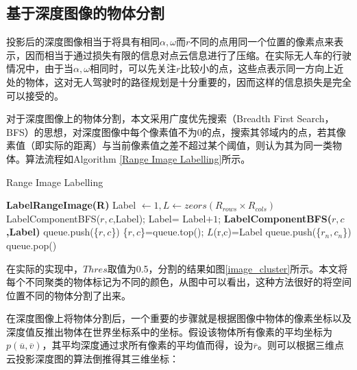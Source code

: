 \subsection{基于深度图像的物体分割}

投影后的深度图像相当于将具有相同$\alpha,\omega$而$r$不同的点用同一个位置的像素点来表示，因而相当于通过损失有限的信息对点云信息进行了压缩。在实际无人车的行驶情况中，由于当$\alpha,\omega$相同时，可以先关注$r$比较小的点，这些点表示同一方向上近处的物体，这对无人驾驶时的路径规划是十分重要的，因而这样的信息损失是完全可以接受的。

对于深度图像上的物体分割，本文采用广度优先搜索（Breadth First Search，BFS）的思想，对深度图像中每个像素值不为0的点，搜索其邻域内的点，若其像素值（即实际的距离）与当前像素值之差不超过某个阈值，则认为其为同一类物体。算法流程如Algorithm \ref{Range Image Labelling}所示。

\begin{algorithm}[ht]
    \caption{Range Image Labelling} %
    \label{Range Image Labelling}

    \begin{algorithmic}[1]
    \State\hspace*{0.02in} {\bf LabelRangeImage(R)}
    \State Label $\leftarrow 1, L \leftarrow zeors(R_{rows} \times R_{cols})$
                \State LabelComponentBFS($r, c$,Label);
                \State Label= Label$+ 1$;
            \EndIf
        \EndFor
    \EndFor
    \State\hspace*{0.02in} {\bf LabelComponentBFS($r, c$,Label)} 
    \State queue.push(\{$r, c$\})
        \State \{$r, c$\}=queue.top();
        \State $L$(r,c)=Label
            \State queue.push(\{$r_n, c_n$\})
            \EndIf
        \EndFor
    queue.pop()
    \EndWhile
    \end{algorithmic}
\end{algorithm}

在实际的实现中，$Thres$取值为0.5，分割的结果如图\ref{image_cluster}所示。本文将每个不同聚类的物体标记为不同的颜色，从图中可以看出，这种方法很好的将空间位置不同的物体分割了出来。

在深度图像上将物体分割后，一个重要的步骤就是根据图像中物体的像素坐标以及深度值反推出物体在世界坐标系中的坐标。假设该物体所有像素的平均坐标为$p(\overline{u}, \overline{v})$，其平均深度通过求所有像素的平均值而得，设为$\overline{r}$。则可以根据三维点云投影深度图的算法倒推得其三维坐标：

